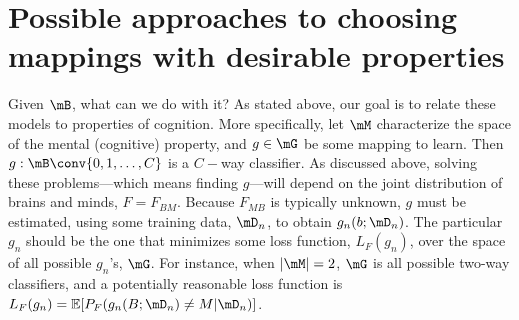 

\section{Possible approaches to choosing mappings with desirable properties}  %
\label{sec:map}

Given $\mB$, what can we do with it? As stated above, our goal is to relate these models to properties of cognition. More specifically, let $\mM$ characterize the space of the mental (cognitive) property, and $g \in \mG$ be some mapping to learn. Then $g: \mB \conv \{0,1,\ldots,C\}$ is a $C-$way classifier. 
As discussed above, solving these problems---which means finding $g$---will depend on the joint distribution of brains and minds, $F=F_{BM}$. Because $F_{MB}$ is typically unknown, $g$ must be estimated, using some training data, $\mD_n$, to obtain $g_n(b; \mD_n)$. The particular $g_n$ should be the one that minimizes some loss function, $L_F(g_n)$, over the space of all possible $g_n$'s, $\mG$. For instance, when $|\mM|=2$, $\mG$ is all possible two-way classifiers, and a potentially reasonable loss function is $L_F(g_n)=\mathbb{E}[P_F(g_n(B;\mD_n) \neq M | \mD_n)]$. %

